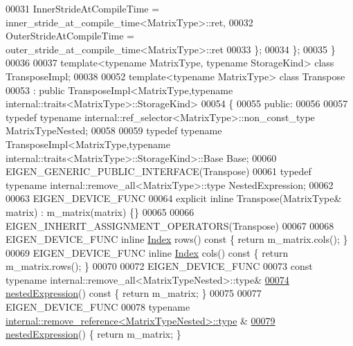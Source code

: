 \begin{DoxyCode}
00031     InnerStrideAtCompileTime = inner\_stride\_at\_compile\_time<MatrixType>::ret,
00032     OuterStrideAtCompileTime = outer\_stride\_at\_compile\_time<MatrixType>::ret
00033   \};
00034 \};
00035 \}
00036 
00037 \textcolor{keyword}{template}<\textcolor{keyword}{typename} MatrixType, \textcolor{keyword}{typename} StorageKind> \textcolor{keyword}{class }TransposeImpl;
00038 
00052 \textcolor{keyword}{template}<\textcolor{keyword}{typename} MatrixType> \textcolor{keyword}{class }Transpose
00053   : \textcolor{keyword}{public} TransposeImpl<MatrixType,typename internal::traits<MatrixType>::StorageKind>
00054 \{
00055   \textcolor{keyword}{public}:
00056 
00057     \textcolor{keyword}{typedef} \textcolor{keyword}{typename} internal::ref\_selector<MatrixType>::non\_const\_type MatrixTypeNested;
00058 
00059     \textcolor{keyword}{typedef} \textcolor{keyword}{typename} TransposeImpl<MatrixType,typename internal::traits<MatrixType>::StorageKind>::Base 
      Base;
00060     EIGEN\_GENERIC\_PUBLIC\_INTERFACE(Transpose)
00061     \textcolor{keyword}{typedef} \textcolor{keyword}{typename} internal::remove\_all<MatrixType>::type NestedExpression;
00062 
00063     EIGEN\_DEVICE\_FUNC
00064     \textcolor{keyword}{explicit} \textcolor{keyword}{inline} Transpose(MatrixType& matrix) : m\_matrix(matrix) \{\}
00065 
00066     EIGEN\_INHERIT\_ASSIGNMENT\_OPERATORS(Transpose)
00067 
00068     EIGEN\_DEVICE\_FUNC \textcolor{keyword}{inline} \hyperlink{namespace_eigen_a62e77e0933482dafde8fe197d9a2cfde}{Index} rows()\textcolor{keyword}{ const }\{ \textcolor{keywordflow}{return} m\_matrix.cols(); \}
00069     EIGEN\_DEVICE\_FUNC \textcolor{keyword}{inline} \hyperlink{namespace_eigen_a62e77e0933482dafde8fe197d9a2cfde}{Index} cols()\textcolor{keyword}{ const }\{ \textcolor{keywordflow}{return} m\_matrix.rows(); \}
00070 
00072     EIGEN\_DEVICE\_FUNC
00073     \textcolor{keyword}{const} \textcolor{keyword}{typename} internal::remove\_all<MatrixTypeNested>::type&
\hyperlink{group___core___module_a72aefbf67f5e3caf62a99f73409b4a63}{00074}     \hyperlink{group___core___module_a72aefbf67f5e3caf62a99f73409b4a63}{nestedExpression}()\textcolor{keyword}{ const }\{ \textcolor{keywordflow}{return} m\_matrix; \}
00075 
00077     EIGEN\_DEVICE\_FUNC
00078     \textcolor{keyword}{typename} \hyperlink{group___sparse_core___module}{internal::remove\_reference<MatrixTypeNested>::type}
      &
\hyperlink{group___core___module_a3265292cf912f401a32eea99975e47ea}{00079}     \hyperlink{group___core___module_a3265292cf912f401a32eea99975e47ea}{nestedExpression}() \{ \textcolor{keywordflow}{return} m\_matrix; \}

\end{DoxyCode}
